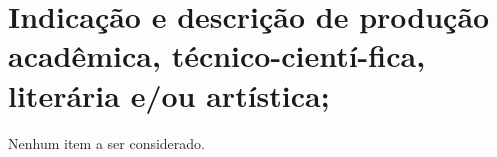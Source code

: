 \section{Indicação e descrição de produção acadêmica, técnico-cientí\hyp{}fica, literária e/ou artística;}

Nenhum item a ser considerado.